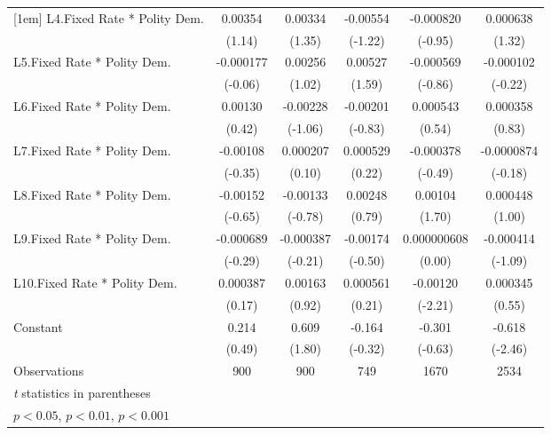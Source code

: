 {\begin{longtable}{l*{5}{c}}
[1em]
L4.Fixed Rate * Polity Dem.&  0.00354         &  0.00334         & -0.00554         &-0.000820         & 0.000638         \\
                &   (1.14)         &   (1.35)         &  (-1.22)         &  (-0.95)         &   (1.32)         \\
[1em]
L5.Fixed Rate * Polity Dem.&-0.000177         &  0.00256         &  0.00527         &-0.000569         &-0.000102         \\
                &  (-0.06)         &   (1.02)         &   (1.59)         &  (-0.86)         &  (-0.22)         \\
[1em]
L6.Fixed Rate * Polity Dem.&  0.00130         & -0.00228         & -0.00201         & 0.000543         & 0.000358         \\
                &   (0.42)         &  (-1.06)         &  (-0.83)         &   (0.54)         &   (0.83)         \\
[1em]
L7.Fixed Rate * Polity Dem.& -0.00108         & 0.000207         & 0.000529         &-0.000378         &-0.0000874         \\
                &  (-0.35)         &   (0.10)         &   (0.22)         &  (-0.49)         &  (-0.18)         \\
[1em]
L8.Fixed Rate * Polity Dem.& -0.00152         & -0.00133         &  0.00248         &  0.00104         & 0.000448         \\
                &  (-0.65)         &  (-0.78)         &   (0.79)         &   (1.70)         &   (1.00)         \\
[1em]
L9.Fixed Rate * Polity Dem.&-0.000689         &-0.000387         & -0.00174         &0.000000608         &-0.000414         \\
                &  (-0.29)         &  (-0.21)         &  (-0.50)         &   (0.00)         &  (-1.09)         \\
[1em]
L10.Fixed Rate * Polity Dem.& 0.000387         &  0.00163         & 0.000561         & -0.00120\sym{*}  & 0.000345         \\
                &   (0.17)         &   (0.92)         &   (0.21)         &  (-2.21)         &   (0.55)         \\
[1em]
Constant        &    0.214         &    0.609         &   -0.164         &   -0.301         &   -0.618\sym{*}  \\
                &   (0.49)         &   (1.80)         &  (-0.32)         &  (-0.63)         &  (-2.46)         \\
\hline
Observations    &      900         &      900         &      749         &     1670         &     2534         \\
\hline\hline
\multicolumn{6}{l}{\footnotesize \textit{t} statistics in parentheses}\\
\multicolumn{6}{l}{\footnotesize \sym{*} \(p<0.05\), \sym{**} \(p<0.01\), \sym{***} \(p<0.001\)}\\
\end{longtable}
}
